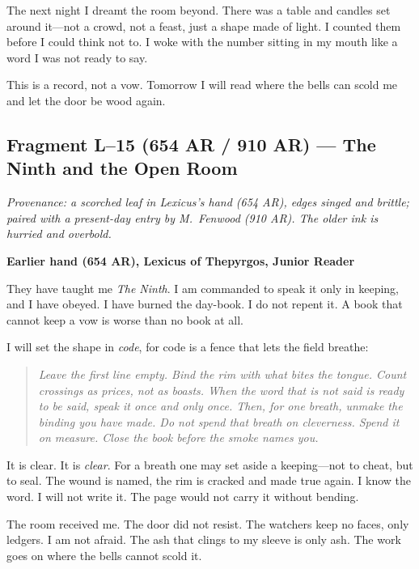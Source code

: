 \documentclass[11pt]{article}
\begin{document}
The next night I dreamt the room beyond. There was a table and candles set around it—not a crowd, not a feast, just a shape made of light. I counted them before I could think not to. I woke with the number sitting in my mouth like a word I was not ready to say.

This is a record, not a vow. Tomorrow I will read where the bells can scold me and let the door be wood again.

\subsection*{Fragment L--15 (654 AR / 910 AR) --- The Ninth and the Open Room}
\label{frag:l15}
{}

\noindent\textit{Provenance: a scorched leaf in Lexicus’s hand (654 AR), edges singed and brittle; paired with a present-day entry by M.\ Fenwood (910 AR). The older ink is hurried and overbold.}

\medskip
\noindent\textbf{Earlier hand (654 AR), Lexicus of Thepyrgos, Junior Reader}

They have taught me \emph{The Ninth}. I am commanded to speak it only in keeping, and I have obeyed. I have burned the day-book. I do not repent it. A book that cannot keep a vow is worse than no book at all.

I will set the shape in \emph{code}, for code is a fence that lets the field breathe:

\begin{quote}\small
\textit{Leave the first line empty. Bind the rim with what bites the tongue. Count crossings as prices, not as boasts. When the word that is not said is ready to be said, speak it once and only once. Then, for one breath, unmake the binding you have made. Do not spend that breath on cleverness. Spend it on measure. Close the book before the smoke names you.}
\end{quote}

It is clear. It is \emph{clear}. For a breath one may set aside a keeping—not to cheat, but to seal. The wound is named, the rim is cracked and made true again. I know the word. I will not write it. The page would not carry it without bending.

The room received me. The door did not resist. The watchers keep no faces, only ledgers. I am not afraid. The ash that clings to my sleeve is only ash. The work goes on where the bells cannot scold it.
\end{document}

